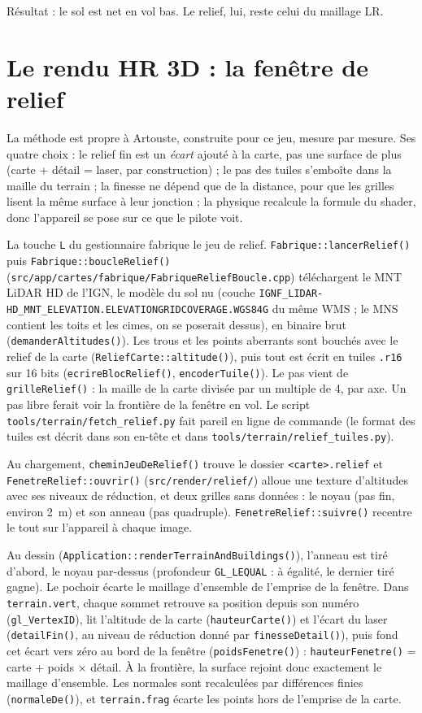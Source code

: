 \documentclass[a4paper,12pt]{article}
\newcommand{\code}[1]{\texttt{#1}}
\begin{document}
Résultat : le sol est net en vol bas. Le relief, lui, reste celui du maillage
LR.

\section{Le rendu HR 3D : la fenêtre de relief}

La méthode est propre à Artouste, construite pour ce jeu, mesure par
mesure. Ses quatre choix : le
relief fin est un \emph{écart} ajouté à la carte, pas une surface de plus
(carte + détail = laser, par construction) ; le pas des tuiles s'emboîte dans
la maille du terrain ; la finesse ne dépend que de la distance, pour que les
grilles lisent la même surface à leur jonction ; la physique recalcule la
formule du shader, donc l'appareil se pose sur ce que le pilote voit.

La touche \code{L} du gestionnaire fabrique le jeu de relief.
\code{Fabrique::lancerRelief()} puis \code{Fabrique::boucleRelief()}
(\code{src/app/cartes/fabrique/FabriqueReliefBoucle.cpp}) téléchargent le MNT
LiDAR HD de l'IGN, le modèle du sol nu (couche
\code{IGNF\_LIDAR-HD\_MNT\_ELEVATION.ELEVATIONGRIDCOVERAGE.WGS84G} du même
WMS ; le MNS contient les toits et les cimes, on se poserait dessus), en
binaire brut (\code{demanderAltitudes()}). Les trous et les points aberrants
sont bouchés avec le relief de la carte (\code{ReliefCarte::altitude()}), puis
tout est écrit en tuiles \code{.r16} sur 16 bits (\code{ecrireBlocRelief()},
\code{encoderTuile()}). Le pas vient de \code{grilleRelief()} : la maille de
la carte divisée par un multiple de 4, par axe. Un pas libre ferait voir la
frontière de la fenêtre en vol. Le script
\code{tools/terrain/fetch\_relief.py} fait pareil en ligne de commande (le
format des tuiles est décrit dans son en-tête et dans
\code{tools/terrain/relief\_tuiles.py}).

Au chargement, \code{cheminJeuDeRelief()} trouve le dossier
\code{<carte>.relief} et \code{FenetreRelief::ouvrir()}
(\code{src/render/relief/}) alloue une texture d'altitudes avec ses niveaux de
réduction, et deux grilles sans données : le noyau (pas fin, environ 2~m) et
son anneau (pas quadruple). \code{FenetreRelief::suivre()} recentre le tout
sur l'appareil à chaque image.

Au dessin (\code{Application::renderTerrainAndBuildings()}), l'anneau est tiré
d'abord, le noyau par-dessus (profondeur \code{GL\_LEQUAL} : à égalité, le
dernier tiré gagne). Le pochoir écarte le maillage d'ensemble de l'emprise de
la fenêtre. Dans \code{terrain.vert}, chaque sommet retrouve sa position
depuis son numéro (\code{gl\_VertexID}), lit l'altitude de la carte
(\code{hauteurCarte()}) et l'écart du laser (\code{detailFin()}, au niveau de
réduction donné par \code{finesseDetail()}), puis fond cet écart vers zéro au
bord de la fenêtre (\code{poidsFenetre()}) : \code{hauteurFenetre()} = carte +
poids $\times$ détail. À la frontière, la surface rejoint donc exactement le
maillage d'ensemble. Les normales sont recalculées par différences finies
(\code{normaleDe()}), et \code{terrain.frag} écarte les points hors de
l'emprise de la carte.
\end{document}

